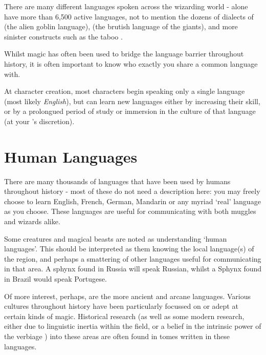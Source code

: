  \label{S:Languages}

There are many different languages spoken across the wizarding world -  alone have more than 6,500 active languages, not to mention the dozens of dialects of  (the alien goblin language),  (the brutish language of the giants), and more sinister constructs such as the taboo .

Whilst magic has often been used to bridge the language barrier throughout history, it is often important to know who exactly you share a common language with. 

At character creation, most characters begin speaking only a single language (most likely {\it English}), but can learn new languages either by increasing their  skill, or by a prolongued period of study or immersion in the culture of that language (at your 's discretion).

\section{Human Languages}

There are many thousands of languages that have been used by humans throughout history - most of these do not need a description here: you may freely choose to learn English, French, German, Mandarin or any myriad `real' language as you choose. These languages are useful for communicating with both muggles and wizards alike. 

Some creatures and magical beasts are noted as understanding `human languages'. This should be interpreted as them knowing the local language(s) of the region, and perhaps a smattering of other languages useful for communicating in that area. A sphynx found in Russia will speak Russian, whilst a Sphynx found in Brazil would speak Portugese.

Of more interest, perhaps, are the more ancient and arcane languages. Various cultures throughout history have been particularly focussed on or adept at certain kinds of magic. Historical research (as well as some modern research, either due to linguistic inertia within the field, or a belief in the intrinsic power of the verbiage ) into these areas are often found in tomes written in these languages.

\newcommand\languageName[3]
{
	\subsubsection{\key{#1}}
	
	#2
	
	\key{Script:} #3

}

